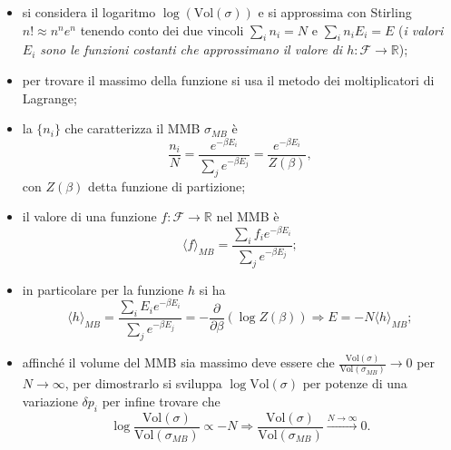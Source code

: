 \documentclass{article}
\theoremstyle{remark}
\begin{document}
\begin{itemize}
\begin{enumerate}
    \end{enumerate}
    \item si considera il logaritmo $\log(\text{Vol}(\sigma))$ e si approssima con Stirling $n!\approx n^ne^n$ tenendo conto dei due vincoli $\sum_{i}{n_i}=N$ e $\sum_{i}{n_iE_i}=E$ (\textit{i valori $E_i$ sono le funzioni costanti che approssimano il valore di $h:\mathcal{F}\to\mathbb{R}$});
    \item per trovare il massimo della funzione si usa il metodo dei moltiplicatori di Lagrange;
    \item la $\{n_i\}$ che caratterizza il MMB $\sigma_{MB}$ è
    \begin{equation}
        \frac{n_i}{N}=\frac{e^{-\beta E_i}}{\sum_{j}{e^{-\beta E_j}}}=\frac{e^{-\beta E_i}}{Z(\beta)},
    \end{equation}
    con $Z(\beta)$ detta funzione di partizione;
    \item il valore di una funzione $f:\mathcal{F}\to\mathbb{R}$ nel MMB è
    \begin{equation}
        \langle f\rangle_{MB}=\frac{\sum_{i}f_ie^{-\beta E_i}}{\sum_{j}{e^{-\beta E_j}}};
    \end{equation}
    \item in particolare per la funzione $h$ si ha
    \begin{equation}
        \langle h\rangle_{MB}=\frac{\sum_{i}E_ie^{-\beta E_i}}{\sum_{j}{e^{-\beta E_j}}}=-\frac{\partial}{\partial \beta}(\log{Z(\beta)})\Rightarrow E=-N\langle h\rangle_{MB};
    \end{equation}
    \item affinché il volume del MMB sia massimo deve essere che $\frac{\text{Vol}(\sigma)}{\text{Vol}(\sigma_{MB})}\to0$ per $N\to\infty$, per dimostrarlo si sviluppa $\log{\text{Vol}(\sigma)}$ per potenze di una variazione $\delta p_i$ per infine trovare che
    \begin{equation}
        \log{\frac{\text{Vol}(\sigma)}{\text{Vol}(\sigma_{MB})}}\propto-N\Rightarrow\frac{\text{Vol}(\sigma)}{\text{Vol}(\sigma_{MB})}\xrightarrow{N\to\infty}0.
    \end{equation}
\end{itemize}
\end{document}
